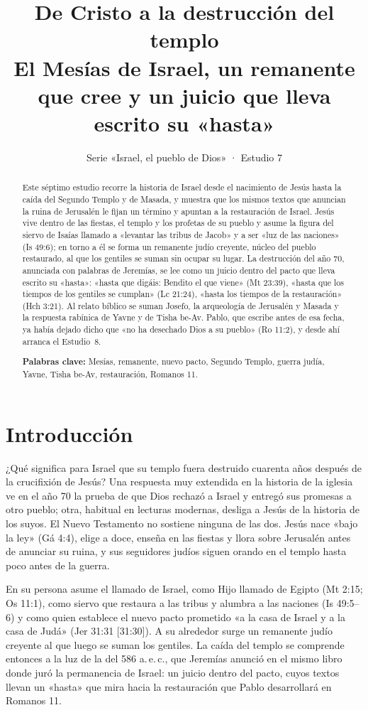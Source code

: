 \documentclass[11pt,letterpaper]{article}
\title{\color{ladrillo}\bfseries De Cristo a la destrucción del templo\\[4pt]\large\color{cafe}\mdseries El Mesías de Israel, un remanente que cree y un juicio que lleva escrito su «hasta»}
\author{}\date{\color{sepia}Serie «Israel, el pueblo de Dios» · Estudio 7}
\begin{document}
\maketitle\thispagestyle{empty}

\begin{abstract}\noindent
Este séptimo estudio recorre la historia de Israel desde el nacimiento de Jesús hasta la caída del Segundo Templo y de Masada, y muestra que los mismos textos que anuncian la ruina de Jerusalén le fijan un término y apuntan a la restauración de Israel. Jesús vive dentro de las fiestas, el templo y los profetas de su pueblo y asume la figura del siervo de Isaías llamado a «levantar las tribus de Jacob» y a ser «luz de las naciones» (Is 49:6); en torno a él se forma un remanente judío creyente, núcleo del pueblo restaurado, al que los gentiles se suman sin ocupar su lugar. La destrucción del año 70, anunciada con palabras de Jeremías, se lee como un juicio dentro del pacto que lleva escrito su «hasta»: «hasta que digáis: Bendito el que viene» (Mt 23:39), «hasta que los tiempos de los gentiles se cumplan» (Lc 21:24), «hasta los tiempos de la restauración» (Hch 3:21). Al relato bíblico se suman Josefo, la arqueología de Jerusalén y Masada y la respuesta rabínica de Yavne y de Tisha be-Av. Pablo, que escribe antes de esa fecha, ya había dejado dicho que «no ha desechado Dios a su pueblo» (Ro 11:2), y desde ahí arranca el Estudio~8.
\par\smallskip\noindent\textbf{Palabras clave:} Mesías, remanente, nuevo pacto, Segundo Templo, guerra judía, Yavne, Tisha be-Av, restauración, Romanos 11.
\end{abstract}

\section{Introducción}

¿Qué significa para Israel que su templo fuera destruido cuarenta años después de la crucifixión de Jesús? Una respuesta muy extendida en la historia de la iglesia ve en el año 70 la prueba de que Dios rechazó a Israel y entregó sus promesas a otro pueblo; otra, habitual en lecturas modernas, desliga a Jesús de la historia de los suyos. El Nuevo Testamento no sostiene ninguna de las dos. Jesús nace «bajo la ley» (Gá 4:4), elige a doce, enseña en las fiestas y llora sobre Jerusalén antes de anunciar su ruina, y sus seguidores judíos siguen orando en el templo hasta poco antes de la guerra.

En su persona asume el llamado de Israel, como Hijo llamado de Egipto (Mt 2:15; Os 11:1), como siervo que restaura a las tribus y alumbra a las naciones (Is 49:5–6) y como quien establece el nuevo pacto prometido «a la casa de Israel y a la casa de Judá» (Jer 31:31 [31:30]). A su alrededor surge un remanente judío creyente al que luego se suman los gentiles. La caída del templo se comprende entonces a la luz de la del 586 a.\,e.\,c., que Jeremías anunció en el mismo libro donde juró la permanencia de Israel: un juicio dentro del pacto, cuyos textos llevan un «hasta» que mira hacia la restauración que Pablo desarrollará en Romanos 11.
\end{document}
